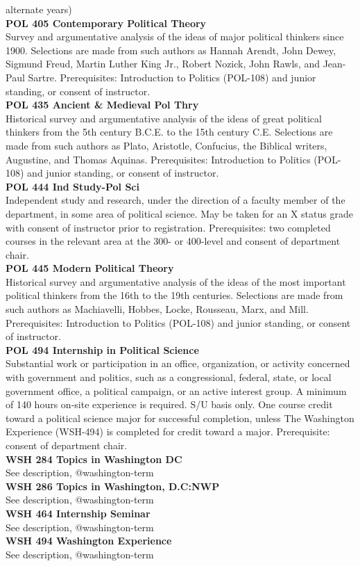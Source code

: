 \documentclass[
  letterpaper,
]{scrbook}
\begin{document}
alternate years)\\
\textbf{POL 405 Contemporary Political Theory}\\
Survey and argumentative analysis of the ideas of major political
thinkers since 1900. Selections are made from such authors as Hannah
Arendt, John Dewey, Sigmund Freud, Martin Luther King Jr., Robert
Nozick, John Rawls, and Jean-Paul Sartre. Prerequisites: Introduction to
Politics (POL-108) and junior standing, or consent of instructor.\\
\textbf{POL 435 Ancient \& Medieval Pol Thry}\\
Historical survey and argumentative analysis of the ideas of great
political thinkers from the 5th century B.C.E. to the 15th century C.E.
Selections are made from such authors as Plato, Aristotle, Confucius,
the Biblical writers, Augustine, and Thomas Aquinas. Prerequisites:
Introduction to Politics (POL-108) and junior standing, or consent of
instructor.\\
\textbf{POL 444 Ind Study-Pol Sci}\\
Independent study and research, under the direction of a faculty member
of the department, in some area of political science. May be taken for
an X status grade with consent of instructor prior to registration.
Prerequisites: two completed courses in the relevant area at the 300- or
400-level and consent of department chair.\\
\textbf{POL 445 Modern Political Theory}\\
Historical survey and argumentative analysis of the ideas of the most
important political thinkers from the 16th to the 19th centuries.
Selections are made from such authors as Machiavelli, Hobbes, Locke,
Rousseau, Marx, and Mill. Prerequisites: Introduction to Politics
(POL-108) and junior standing, or consent of instructor.\\
\textbf{POL 494 Internship in Political Science}\\
Substantial work or participation in an office, organization, or
activity concerned with government and politics, such as a
congressional, federal, state, or local government office, a political
campaign, or an active interest group. A minimum of 140 hours on-site
experience is required. S/U basis only. One course credit toward a
political science major for successful completion, unless The Washington
Experience (WSH-494) is completed for credit toward a major.
Prerequisite: consent of department chair.\\
\textbf{WSH 284 Topics in Washington DC}\\
See description, @washington-term\\
\textbf{WSH 286 Topics in Washington, D.C:NWP}\\
See description, @washington-term\\
\textbf{WSH 464 Internship Seminar}\\
See description, @washington-term\\
\textbf{WSH 494 Washington Experience}\\
See description, @washington-term
\end{document}
